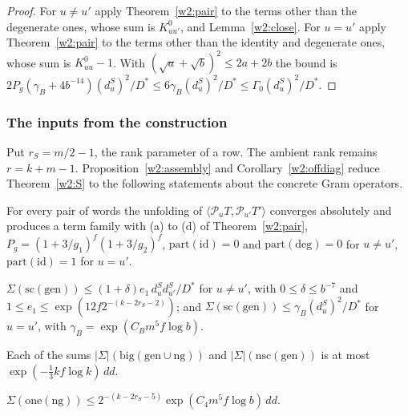 \begin{proof}
For $u\ne u'$ apply Theorem~\ref{w2:pair} to the terms other than the degenerate ones, whose sum is $K^0_{uu'}$, and Lemma~\ref{w2:close}. For $u=u'$ apply Theorem~\ref{w2:pair} to the terms other than the identity and degenerate ones, whose sum is $K^0_{uu}-1$. With $(\sqrt a+\sqrt b)^2\le2a+2b$ the bound is $2P_g(\gamma_B+4b^{-14})(d^S_u)^2/D^*\le6\gamma_B(d^S_u)^2/D^*\le\Gamma_0(d^S_u)^2/D^*$.
\end{proof}

\subsubsection{The inputs from the construction}\label{w2:sec:Sinputs}

Put $r_S=m/2-1$, the rank parameter of a row. The ambient rank remains $r=k+m-1$. Proposition~\ref{w2:assembly} and Corollary~\ref{w2:offdiag} reduce Theorem~\ref{w2:S} to the following statements about the concrete Gram operators.

\begin{hypothesis}\label{w2:H-KE}
For every pair of words the unfolding of $\langle\mathcal P_uT,\mathcal P_{u'}T'\rangle$ converges absolutely and produces a term family with (a) to (d) of Theorem~\ref{w2:pair}, $P_g=(1+3/g_1)^f(1+3/g_2)^f$, $\mathrm{part}(\mathrm{id})=0$ and $\mathrm{part}(\mathrm{deg})=0$ for $u\ne u'$, $\mathrm{part}(\mathrm{id})=1$ for $u=u'$.
\end{hypothesis}

\begin{hypothesis}\label{w2:H-MR}
$\Sigma(\mathrm{sc}(\mathrm{gen}))\le(1+\delta)e_1\,d^S_ud^S_{u'}/D^*$ for $u\ne u'$, with $0\le\delta\le b^{-7}$ and $1\le e_1\le\exp(12f2^{-(k-2r_S-2)})$; and $\Sigma(\mathrm{sc}(\mathrm{gen}))\le\gamma_B(d^S_u)^2/D^*$ for $u=u'$, with $\gamma_B=\exp(C_Bm^5f\log b)$.
\end{hypothesis}

\begin{hypothesis}[S-LR, loops]\label{w2:H-LR}
Each of the sums $\lvert\Sigma\rvert(\mathrm{big}(\mathrm{gen}\cup\mathrm{ng}))$ and $\lvert\Sigma\rvert(\mathrm{nsc}(\mathrm{gen}))$ is at most $\exp(-\tfrac13kf\log k)\,dd$.
\end{hypothesis}

\begin{hypothesis}\label{w2:H-NG}
$\Sigma(\mathrm{one}(\mathrm{ng}))\le2^{-(k-2r_S-5)}\exp(C_4m^5f\log b)\,dd$.
\end{hypothesis}

